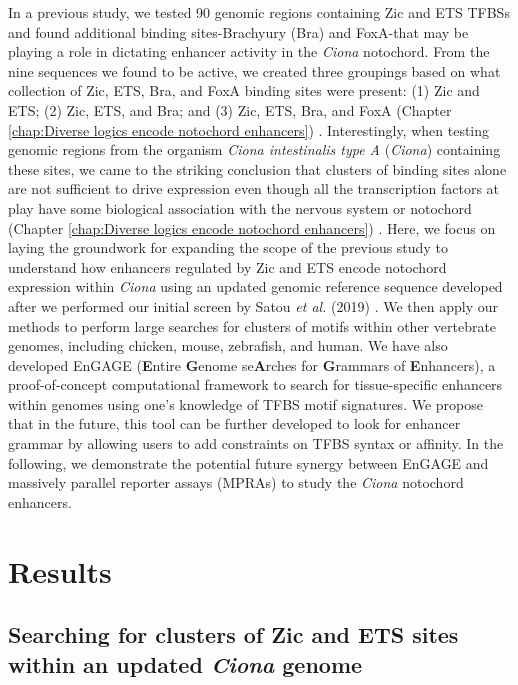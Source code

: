 In a previous study, we tested 90 genomic regions containing Zic and ETS TFBSs and found additional binding sites-Brachyury (Bra) and FoxA-that may be playing a role in dictating enhancer activity in the \textit{Ciona} notochord. From the nine sequences we found to be active, we created three groupings based on what collection of Zic, ETS, Bra, and FoxA binding sites were present: (1) Zic and ETS; (2) Zic, ETS, and Bra; and (3) Zic, ETS, Bra, and FoxA (Chapter \ref{chap:Diverse logics encode notochord enhancers}) \cite{song2022}. Interestingly, when testing genomic regions from the organism \textit{Ciona intestinalis type A} (\textit{Ciona}) containing these sites, we came to the striking conclusion that clusters of binding sites alone are not sufficient to drive expression even though all the transcription factors at play have some biological association with the nervous system or notochord (Chapter \ref{chap:Diverse logics encode notochord enhancers}) \cite{song2022}. Here, we focus on laying the groundwork for expanding the scope of the previous study to understand how enhancers regulated by Zic and ETS encode notochord expression within \textit{Ciona} using an updated genomic reference sequence developed after we performed our initial screen by Satou \textit{et al.} (2019) \cite{satou2019}. We then apply our methods to perform large searches for clusters of motifs within other vertebrate genomes, including chicken, mouse, zebrafish, and human. We have also developed EnGAGE (\textbf{E}ntire \textbf{G}enome se\textbf{A}rches for \textbf{G}rammars of \textbf{E}nhancers), a proof-of-concept computational framework to search for tissue-specific enhancers within genomes using one's knowledge of TFBS motif signatures. We propose that in the future, this tool can be further developed to look for enhancer grammar by allowing users to add constraints on TFBS syntax or affinity. In the following, we demonstrate the potential future synergy between EnGAGE and massively parallel reporter assays (MPRAs) to study the \textit{Ciona} notochord enhancers. 

\section{Results}

\subsection{Searching for clusters of Zic and ETS sites within an updated \textit{Ciona} genome}

